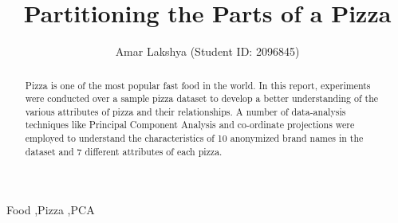 \documentclass[preprint,12pt]{elsarticle}
\begin{document}
\begin{frontmatter}



\title{Partitioning the Parts of a Pizza}


\author{Amar Lakshya (Student ID: 2096845)}

\address{School of Computer Science, University of Birmingham}

\begin{abstract}
Pizza is one of the most popular fast food in the world. In this report, experiments were conducted over a sample pizza dataset
to develop a better understanding of the various attributes of pizza and their relationships. A number of data-analysis techniques
like Principal Component Analysis and co-ordinate projections were employed to understand the characteristics of  10 anonymized 
brand names in the dataset and 7 different attributes of each pizza.
\end{abstract}

\begin{keyword}
Food \sep Pizza \sep PCA

\end{keyword}

\end{frontmatter}


\end{document}
